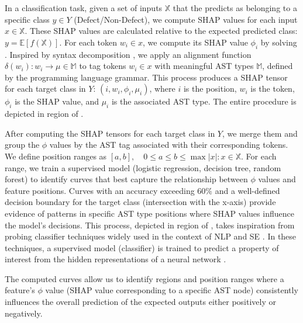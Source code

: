 In a classification task, given a set of inputs $\mathbb{X}$ that the \lcm predicts as belonging to a specific class $y \in Y$ (\eg Defect/Non-Defect), we compute SHAP values for each input $x \in \mathbb{X}$. These SHAP values are calculated relative to the expected predicted class: $y = \mathbb{E}[f(\mathbb{X})]$. For each token $w_i \in x$, we compute its SHAP value $\phi_i$ by solving . Inspired by syntax decomposition \cite{syntax_capabilities, asttrust, docode}, we apply an alignment function $\delta(w_i): w_i \to \mu \in \mathbb{M}$ to tag tokens $w_i \in x$ with meaningful AST types $\mathbb{M}$, defined by the programming language grammar. This process produces a SHAP tensor for each target class in $Y$: ${(i, w_i, \phi_i, \mu_i)}$, where $i$ is the position, $w_i$ is the token, $\phi_i$ is the SHAP value, and $\mu_i$ is the associated AST type. The entire procedure is depicted in region  of .

After computing the SHAP tensors for each target class in $Y$, we merge them and group the $\phi$ values by the AST tag associated with their corresponding tokens. We define position ranges as $[a, b], \quad 0 \leq a \leq b \leq \max{|x|: x \in \mathbb{X}}$. For each range, we train a supervised model (\eg logistic regression, decision tree, random forest) to identify curves that best capture the relationship between $\phi$ values and feature positions. Curves with an accuracy exceeding $60\%$ and a well-defined decision boundary for the target class (\ie intersection with the x-axis) provide evidence of patterns in specific AST type positions where SHAP values influence the model's decisions. This process, depicted in region  of , takes inspiration from probing classifier techniques widely used in the context of NLP \cite{hewitt_designing_2019} and SE \cite{lopez_ast-probe_2022, troshin_probing_2022}. In these techniques, a supervised model (\eg classifier) is trained to predict a property of interest from the hidden representations of a neural network \cite{belinkov_probing_2021}.

The computed curves allow us to identify regions and position ranges where a feature’s $\phi$ value (\ie SHAP value corresponding to a specific AST node) consistently influences the overall prediction of the expected outputs either positively or negatively. 

